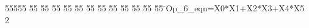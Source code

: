 %
%
\begin{tabbing}
55555 \= 55 \= 55 \= 55 \= 55 \= 55 \= 55 \= 55 \= 55 \= 55 \= 55 \= 55 \= 55 \= \>Op\_6\_eqn=X0*X1+X2*X3+X4*X5\\[0pt]
2\>\end{tabbing}
